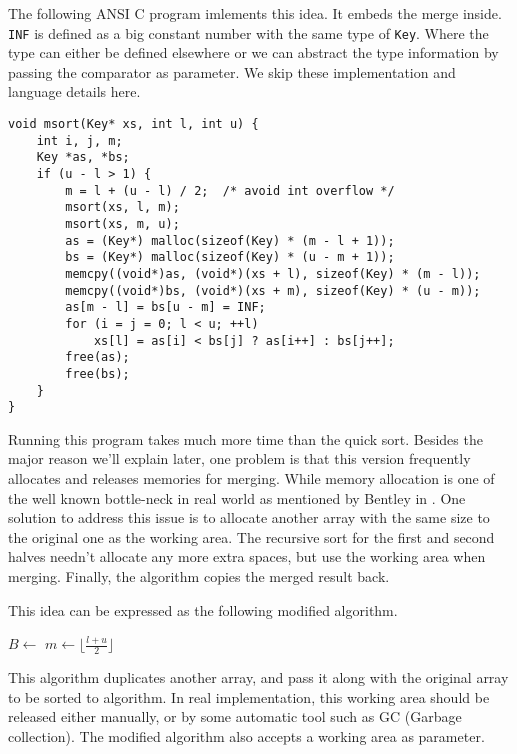 \documentclass[UTF8]{article}
\begin{document}
The following ANSI C program imlements this idea. It embeds the merge inside. \verb|INF| is defined
as a big constant number with the same type of \verb|Key|. Where the type can either be defined elsewhere
or we can abstract the type information by passing the comparator as parameter. We skip these
implementation and language details here.

\lstset{language=C}
\begin{lstlisting}
void msort(Key* xs, int l, int u) {
    int i, j, m;
    Key *as, *bs;
    if (u - l > 1) {
        m = l + (u - l) / 2;  /* avoid int overflow */
        msort(xs, l, m);
        msort(xs, m, u);
        as = (Key*) malloc(sizeof(Key) * (m - l + 1));
        bs = (Key*) malloc(sizeof(Key) * (u - m + 1));
        memcpy((void*)as, (void*)(xs + l), sizeof(Key) * (m - l));
        memcpy((void*)bs, (void*)(xs + m), sizeof(Key) * (u - m));
        as[m - l] = bs[u - m] = INF;
        for (i = j = 0; l < u; ++l)
            xs[l] = as[i] < bs[j] ? as[i++] : bs[j++];
        free(as);
        free(bs);
    }
}
\end{lstlisting}

Running this program takes much more time than the quick sort. Besides the major reason we'll explain later,
one problem is that this version frequently allocates and releases memories for merging. While memory
allocation is one of the well known bottle-neck in real world as mentioned by Bentley in \cite{pearls}.
One solution to address this issue is to allocate another array with the same size to the original one
as the working area. The recursive sort for the first and second halves needn't allocate any more
extra spaces, but use the working area when merging. Finally, the algorithm copies
the merged result back.

This idea can be expressed as the following modified algorithm.

\begin{algorithmic}[1]
  \State $B \gets $ 
  \State {}
\EndProcedure
\Statex
{}
    \State $m \gets \lfloor \frac{l + u}{2} \rfloor$
    \State {}
    \State {}
    \State {}
  \EndIf
\EndProcedure
\end{algorithmic}

This algorithm duplicates another array, and pass it along with the original array to be sorted
to  algorithm. In real implementation, this working area should be released
either manually, or by some automatic tool such as GC (Garbage collection).
The modified algorithm  also accepts a working area as parameter.
\end{document}
